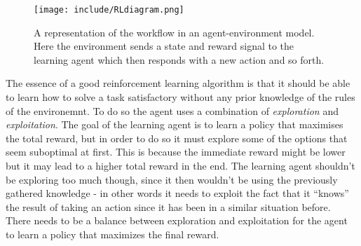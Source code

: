 \documentclass[11pt]{article}
\begin{document}
\begin{figure}[!h]
    \centering
    \texttt{[image: include/RLdiagram.png]}
    \caption{A representation of the workflow in an agent-environment
    model. Here the environment sends a state and reward signal to the
    learning agent which then responds with a new action and so forth.}
    \label{fig:agent_enviroment}
\end{figure}

The essence of a good reinforcement learning algorithm is that it should be able to learn
how to solve a task satisfactory without any prior knowledge of the rules of the environemnt.
To do so the agent uses a combination of \textit{exploration} and \textit{exploitation}.
The goal of the learning agent is to learn a policy that maximises the total reward, but in order to do
so it must explore some of the options that seem suboptimal at first.
This is because the immediate reward might be lower but it may lead to a higher total reward in the end.
The learning agent shouldn't be exploring too much though, since it then wouldn't
be using the previously gathered knowledge - in other words it needs to
exploit the fact that it “knows” the result of taking an action since it has been in
a similar situation before.
There needs to be a balance between exploration and exploitation for the
agent to learn a policy that maximizes the final reward.
\end{document}
